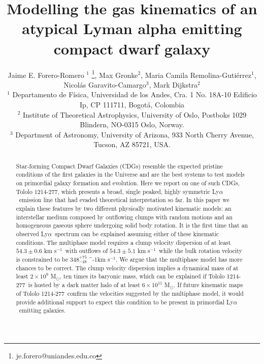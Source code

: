 \documentclass[a4,useAMS,usenatbib,usegraphicx]{mn2e}
\newcommand{\tol}{Tololo 1214-277}
\newcommand{\lya}{\ifmmode{{\rm Ly}\alpha}\else Ly$\alpha$\ \fi}
\newcommand{\kms}{\ifmmode\mathrm{km\ s}^{-1}\else km s$^{-1}$\fi}
\newcommand{\sigmaclump}{$54.3\pm 0.6$ km s$^{-1}$}
\newcommand{\inftyclump}{$54.3\pm 5.1$ km s$^{-1}$}
\begin{document}
\title[An atypical \lya dwarf galaxy]{
Modelling the gas kinematics of an atypical Lyman alpha emitting compact dwarf galaxy}
\author[J.E. Forero-Romero et al.]
{Jaime E. Forero-Romero $^{1}$ \thanks{je.forero@uniandes.edu.co},
Max Gronke$^2$, 
Maria Camila Remolina-Guti\'errez$^1$,
\newauthor
Nicol\'as Garavito-Camargo$^3$, 
Mark Dijkstra$^2$\\
$^1$ Departamento de F\'isica, Universidad de los Andes, Cra. 1
  No. 18A-10 Edificio Ip, CP 111711, Bogot\'a, Colombia \\
$^2$ Institute of Theoretical Astrophysics, University of Oslo,
Postboks 1029 Blindern, NO-0315 Oslo, Norway.\\
$^3$ Department of Astronomy, University of Arizona, 933 North Cherry
Avenue, Tucson, AZ 85721, USA. 
}


\maketitle


\begin{abstract}
	
Star-forming Compact Dwarf Galaxies (CDGs) 
resemble the expected pristine conditions of the first galaxies in the
Universe and are the best systems to test models on primordial galaxy
formation and evolution. 
Here we report on one of such CDGs, \tol, which presents
a broad, single peaked, highly symmetric \lya emission line that had
evaded theoretical interpretation so far.  
In this paper we explain these features by two different physically
motivated kinematic models: 
an interstellar medium composed by outflowing clumps with 
random motions and an homogeneous gaseous sphere undergoing solid body
rotation.
It is the first time that an observed \lya spectrum can be explained
assuming either of these kinematic conditions.
The multiphase model requires a clump velocity dispersion of
at least \sigmaclump\ with outflows of \inftyclump\, while the
bulk rotation velocity is constrained to be $348^{+75}_{-48}$ \kms.
We argue that the multiphase model has more chances to be correct.
The clump velocity dispersion implies a dynamical mass of at least $2\times
10^{9}$ M$_{\odot}$, ten times its baryonic mass, which can be
explained if \tol\ is hosted by a dark matter halo of at least
$6\times 10^{11}$ M$_{\odot}$.
If future kinematic maps of \tol\ confirm the velocities suggested by the
multiphase model, it would provide additional support to expect this
condition to be present  in primordial \lya emitting galaxies.  
\end{abstract}
\end{document}
